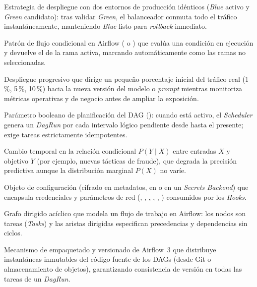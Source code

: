 {\begin{description}[style=standard, itemsep=2pt, parsep=0pt, topsep=4pt, leftmargin=1.1em, font=\sffamily\bfseries\color{PrimaryDark}]
\item[Blue/Green Deployment.]
Estrategia de despliegue con dos entornos de producción idénticos (\textit{Blue} activo y \textit{Green} candidato): tras validar \textit{Green}, el balanceador conmuta todo el tráfico instantáneamente, manteniendo \textit{Blue} listo para \textit{rollback} inmediato.

\item[Branching.]
Patrón de flujo condicional en Airflow ( o ) que evalúa una condición en ejecución y devuelve el  de la rama activa, marcando automáticamente como  las ramas no seleccionadas.

\item[Canary Deployment.]
Despliegue progresivo que dirige un pequeño porcentaje inicial del tráfico real (1\,\%, 5\,\%, 10\,\%) hacia la nueva versión del modelo o \textit{prompt} mientras monitoriza métricas operativas y de negocio antes de ampliar la exposición.

\item[Catchup.]
Parámetro booleano de planificación del DAG (): cuando está activo, el \textit{Scheduler} genera un \textit{DagRun} por cada intervalo lógico pendiente desde  hasta el presente; exige tareas estrictamente idempotentes.

\item[Concept Drift.]
Cambio temporal en la relación condicional $P(Y \mid X)$ entre entradas $X$ y objetivo $Y$ (por ejemplo, nuevas tácticas de fraude), que degrada la precisión predictiva aunque la distribución marginal $P(X)$ no varíe.

\item[Connection (Airflow).]
Objeto de configuración (cifrado en metadatos, en  o en un \textit{Secrets Backend}) que encapsula credenciales y parámetros de red (, , , , , ) consumidos por los \textit{Hooks}.

\item[DAG (Directed Acyclic Graph).]
Grafo dirigido acíclico que modela un flujo de trabajo en Airflow: los nodos son tareas (\textit{Tasks}) y las aristas dirigidas especifican precedencias y dependencias sin ciclos.

\item[DAG Bundle (Airflow 3).]
Mecanismo de empaquetado y versionado de Airflow~3 que distribuye instantáneas inmutables del código fuente de los DAGs (desde Git o almacenamiento de objetos), garantizando consistencia de versión en todas las tareas de un \textit{DagRun}.


\end{description}}
